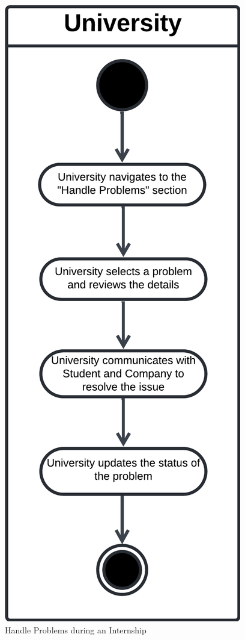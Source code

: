 \begin{figure}[H]
    \begin{center}
         \includegraphics[width=0.5\linewidth]{LaTeXCode/images/activity diagram/UC17.png}
         \caption{Handle Problems during an Internship}
         \label{fig:handle_problems_ad}
     \end{center}
\end{figure}

\newpage

